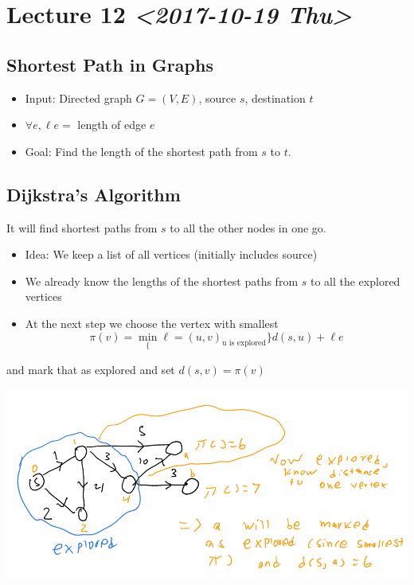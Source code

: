 \documentclass[11pt]{article}
\begin{document}
\section{Lecture 12 \textit{<2017-10-19 Thu>}}
\label{sec:org5c078a9}
\subsection{Shortest Path in Graphs}
\label{sec:org4606e5d}
\begin{itemize}
\item Input: Directed graph \(G=(V,E)\), source \(s\), destination \(t\)
\item \(\forall e, \ell e =\) length of edge \(e\)
\item Goal: Find the length of the shortest path from \uline{\(s\)} to \uline{\(t\)}.
\end{itemize}
\subsection{Dijkstra's Algorithm}
\label{sec:orge9db366}
It will find shortest paths from \(s\) to all the other nodes in one go.
\begin{itemize}
\item Idea: We keep a list of all vertices (initially includes source)
\item We already know the lengths of the shortest paths from \(s\) to all the explored vertices
\item At the next step we choose the vertex with smallest
$$\pi(v)=\min_\{\ell=(u,v)_\text{u is explored}\} d(s,u)+\ell e$$
\end{itemize}
and mark that as explored and set \(d(s,v)=\pi(v)\)
\begin{center}
\includegraphics[width=.9\linewidth]{./Images/i37.png}
\end{center}
\end{document}
